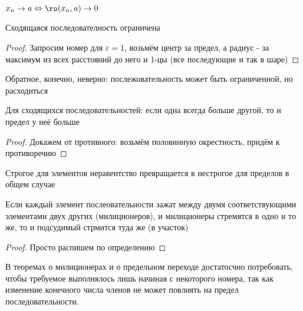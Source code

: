 \documentclass[12pt, a4paper]{article}
\begin{document}
  \begin{note}
  $x_n \to a \Leftrightarrow \ro(x_n, a) \to 0$
  \end{note}

  \begin{theorem}
  Сходящаяся последователность ограничена
  \end{theorem}
  \begin{proof}
  Запросим номер для $\varepsilon = 1$, возьмём центр за предел, 
  а радиус - за максимум из всех расстояний до него и 1-цы (все последующие и так в шаре)
  \end{proof}

  \begin{note}
  Обратное, конечно, неверно: послежовательность может быть ограниченной, но расходиться
  \end{note}


  \begin{theorem}
  Для сходящихся последовательностей: если одна всегда больше другой, то и предел у неё больше
  \end{theorem}
  \begin{proof}
  Докажем от противного: возьмём половинную окрестность, придём к противоречию
  \end{proof}

  \begin{note}
  Строгое для элементов неравентство превращается в нестрогое для пределов в общем случае
  \end{note}

  \begin{definition}
  \end{definition}



  \begin{theorem}
  Если каждый элемент послеовательности зажат между двумя соответствующими элементами двух других (милиционеров), 
  и милиционеры стремятся в одно и то же, то и подсудимый стрмится туда же (в участок)
  \end{theorem}
  \begin{proof}
  Просто распишем по определению
  \end{proof}


  \begin{note}
  В теоремах о милиционерах и о предельном переходе достатосчно потребовать,
  чтобы требуемое выполнялось лишь начиная с некоторого номера, так как 
  изменение конечного числа членов не может повлиять на предел последовательности.
  \end{note}
\end{document}
